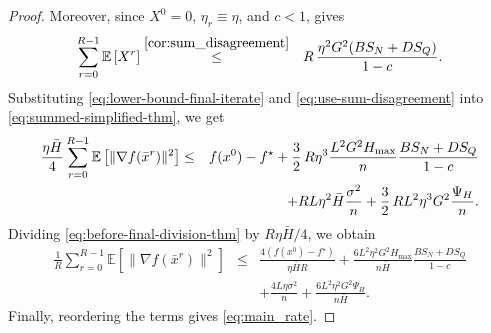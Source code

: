 \documentclass{article}
\newcommand{\Exp}[1]{{\mathbb{E}} \left[ #1 \right]}
\theoremstyle{plain}
\theoremstyle{definition}
\begin{document}
\begin{proof}
    Moreover, since \(X^0=0\), \(\eta_r\equiv\eta\), and \(c<1\),  gives
    \begin{eqnarray}
    \sum_{r=0}^{R-1}\Exp{X^r}
    &\overset{\Cref{cor:sum_disagreement}}{\leq}&
    R\,\frac{\eta^2G^2(BS_N+DS_Q)}{1-c}.
    \label{eq:use-sum-disagreement}
    \end{eqnarray}
    Substituting \eqref{eq:lower-bound-final-iterate} and
    \eqref{eq:use-sum-disagreement} into \eqref{eq:summed-simplified-thm}, we get
    \begin{eqnarray}
    \frac{\eta\bar H}{4}
    \sum_{r=0}^{R-1}\Exp{\|\nabla f(\bar x^r)\|^2}
    &\leq&
    f(x^0)-f^\star
    +
    \frac{3}{2}\,R\eta^3\frac{L^2G^2H_{\max}}{n}
    \frac{BS_N+DS_Q}{1-c}
    \notag\\
    &&+
    R L\eta^2\bar H\frac{\sigma^2}{n}
    +
    \frac{3}{2}\,R L^2\eta^3G^2\frac{\Psi_H}{n}.
    \label{eq:before-final-division-thm}
    \end{eqnarray}
    Dividing \eqref{eq:before-final-division-thm} by \(R\eta\bar H/4\), we obtain
    \begin{eqnarray*}
    \frac1R\sum_{r=0}^{R-1}\Exp{\|\nabla f(\bar x^r)\|^2}
    &\leq&
    \frac{4(f(x^0)-f^\star)}{\eta\bar H R}
    +
    \frac{6L^2\eta^2G^2H_{\max}}{n\bar H}
    \frac{BS_N+DS_Q}{1-c}
    \\
    &&+
    \frac{4L\eta\sigma^2}{n}
    +
    \frac{6L^2\eta^2G^2\Psi_H}{n\bar H}.
    \end{eqnarray*}
    Finally, reordering the terms gives \eqref{eq:main_rate}.
\end{proof}
% 
\end{document}
